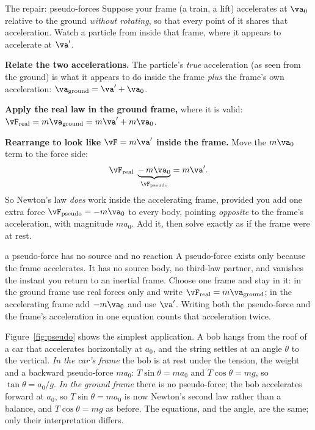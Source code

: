 \begin{derivbox}{The repair: pseudo-forces}
Suppose your frame (a train, a lift) accelerates at $\va_0$ relative to the ground \emph{without
rotating}, so that every point of it shares that acceleration. Watch a particle from
inside that frame, where it appears to accelerate at $\va'$.

 \textbf{Relate the two accelerations.} The particle's \emph{true} acceleration (as seen from the
ground) is what it appears to do inside the frame \emph{plus} the frame's own acceleration:
$\va_{\text{ground}}=\va'+\va_0$.

 \textbf{Apply the real law in the ground frame,} where it is valid:
$\vF_{\text{real}}=m\va_{\text{ground}}=m\va'+m\va_0$.

 \textbf{Rearrange to look like $\vF=m\va'$ inside the frame.} Move the $m\va_0$ term to the
force side:
\[
\vF_{\text{real}}\;\underbrace{-\,m\va_0}_{\vF_{\text{pseudo}}}=m\va'.
\]
So Newton's law \emph{does} work inside the accelerating frame, provided you add one extra force
$\vF_{\text{pseudo}}=-m\va_0$ to every body, pointing \emph{opposite} to the frame's acceleration, with
magnitude $m a_0$. Add it, then solve exactly as if the frame were at rest.
\end{derivbox}

\begin{trapbox}{a pseudo-force has no source and no reaction}
A pseudo-force exists only because the frame accelerates. It has no source body, no third-law partner,
and vanishes the instant you return to an inertial frame. Choose one frame and stay in it: in the
ground frame use real forces only and write $\vF_{\text{real}}=m\va_{\text{ground}}$; in the accelerating
frame add $-m\va_0$ and use $\va'$. Writing both the pseudo-force and the frame's acceleration in one
equation counts that acceleration twice.
\end{trapbox}

\begin{figure}[htbp]
\centering
{}
\end{figure}

Figure~\ref{fig:pseudo} shows the simplest application. A bob hangs from the roof of a car that
accelerates horizontally at $a_0$, and the string settles at an angle $\theta$ to the vertical.
\emph{In the car's frame} the bob is at rest under the tension, the weight and a backward pseudo-force
$ma_0$: $T\sin\theta=ma_0$ and $T\cos\theta=mg$, so $\tan\theta=a_0/g$. \emph{In the ground frame}
there is no pseudo-force; the bob accelerates forward at $a_0$, so $T\sin\theta=ma_0$ is now Newton's
second law rather than a balance, and $T\cos\theta=mg$ as before. The equations, and the angle, are the
same; only their interpretation differs.

